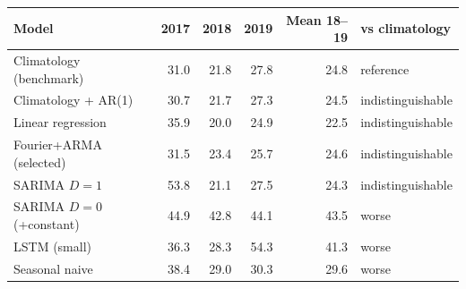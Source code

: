 \begin{tabular}{|l|r|r|r|r|l|}
\hline
\textbf{Model} & \textbf{2017} & \textbf{2018} & \textbf{2019} & \textbf{Mean 18--19} & \textbf{vs climatology} \\\hline
Climatology (benchmark) & 31.0 & 21.8 & 27.8 & 24.8 & reference \\\hline
Climatology + AR(1) & 30.7 & 21.7 & 27.3 & 24.5 & indistinguishable \\\hline
Linear regression & 35.9 & 20.0 & 24.9 & 22.5 & indistinguishable \\\hline
Fourier+ARMA (selected) & 31.5 & 23.4 & 25.7 & 24.6 & indistinguishable \\\hline
SARIMA $D=1$ & 53.8 & 21.1 & 27.5 & 24.3 & indistinguishable \\\hline
SARIMA $D=0$ (+constant) & 44.9 & 42.8 & 44.1 & 43.5 & worse \\\hline
LSTM (small) & 36.3 & 28.3 & 54.3 & 41.3 & worse \\\hline
Seasonal naive & 38.4 & 29.0 & 30.3 & 29.6 & worse \\\hline
\end{tabular}
